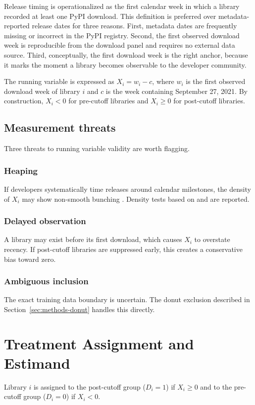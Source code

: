 \documentclass[12pt, a4paper]{report}
\begin{document}
Release timing is operationalized as the first calendar week in which a library recorded at least one PyPI download. This definition is preferred over metadata-reported release dates for three reasons. First, metadata dates are frequently missing or incorrect in the PyPI registry. Second, the first observed download week is reproducible from the download panel and requires no external data source. Third, conceptually, the first download week is the right anchor, because it marks the moment a library becomes observable to the developer community.

The running variable is expressed as $X_i = w_i - c$, where $w_i$ is the first observed download week of library $i$ and $c$ is the week containing September 27, 2021. By construction, $X_i < 0$ for pre-cutoff libraries and $X_i \geq 0$ for post-cutoff libraries.

\subsection{Measurement threats}\label{subsec:methods-threats}
Three threats to running variable validity are worth flagging.

\subsubsection{Heaping}\label{subsubsec:methods-heaping}
If developers systematically time releases around calendar milestones, the density of $X_i$ may show non-smooth bunching \citep{barreca2016heaping}. Density tests based on \citet{mccrary2008manipulation} and \citet{cattaneo2020density} are reported.

\subsubsection{Delayed observation}\label{subsubsec:methods-delayed}
A library may exist before its first download, which causes $X_i$ to overstate recency. If post-cutoff libraries are suppressed early, this creates a conservative bias toward zero.

\subsubsection{Ambiguous inclusion}\label{subsubsec:methods-inclusion}
The exact training data boundary is uncertain. The donut exclusion described in Section~\ref{sec:methods-donut} handles this directly.

\section{Treatment Assignment and Estimand}\label{sec:methods-treatment}
Library $i$ is assigned to the post-cutoff group ($D_i = 1$) if $X_i \geq 0$ and to the pre-cutoff group ($D_i = 0$) if $X_i < 0$.
\end{document}
